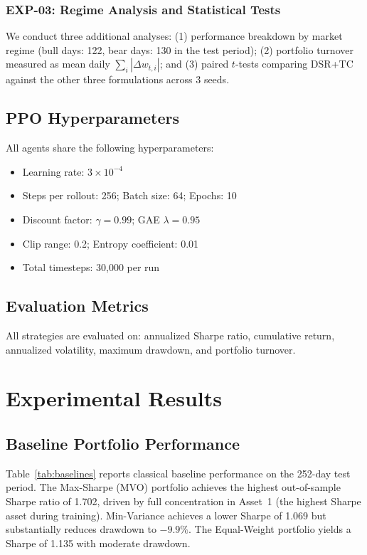 \documentclass[conference]{IEEEtran}
\begin{document}
\subsubsection{EXP-03: Regime Analysis and Statistical Tests}
We conduct three additional analyses: (1) performance breakdown by market
regime (bull days: 122, bear days: 130 in the test period); (2) portfolio
turnover measured as mean daily $\sum_i |\Delta w_{t,i}|$; and (3) paired
$t$-tests comparing DSR+TC against the other three formulations across 3 seeds.

\subsection{PPO Hyperparameters}
All agents share the following hyperparameters:
\begin{itemize}
    \item Learning rate: $3 \times 10^{-4}$
    \item Steps per rollout: 256; Batch size: 64; Epochs: 10
    \item Discount factor: $\gamma = 0.99$; GAE $\lambda = 0.95$
    \item Clip range: 0.2; Entropy coefficient: 0.01
    \item Total timesteps: 30,000 per run
\end{itemize}

\subsection{Evaluation Metrics}
All strategies are evaluated on: annualized Sharpe ratio, cumulative return,
annualized volatility, maximum drawdown, and portfolio turnover.

\section{Experimental Results}
\label{sec:experiments}

\subsection{Baseline Portfolio Performance}
Table~\ref{tab:baselines} reports classical baseline performance on the 252-day
test period. The Max-Sharpe (MVO) portfolio achieves the highest out-of-sample
Sharpe ratio of 1.702, driven by full concentration in Asset~1 (the highest
Sharpe asset during training). Min-Variance achieves a lower Sharpe of 1.069 but
substantially reduces drawdown to $-9.9\%$. The Equal-Weight portfolio yields a
Sharpe of 1.135 with moderate drawdown.
\end{document}
